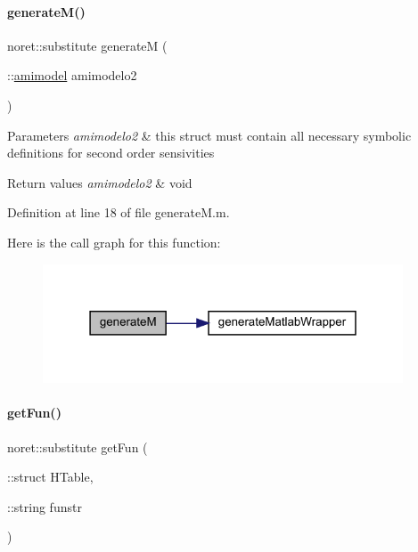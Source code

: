 \paragraph{\texorpdfstring{generateM()}{generateM()}}
{\footnotesize\ttfamily noret\+::substitute generateM (\begin{DoxyParamCaption}\item[{\+::\mbox{\hyperlink{classamimodel}{amimodel}}}]{amimodelo2 }\end{DoxyParamCaption})}


\begin{DoxyParams}{Parameters}
{\em amimodelo2} & this struct must contain all necessary symbolic definitions for second order sensivities\\
\hline
\end{DoxyParams}

\begin{DoxyRetVals}{Return values}
{\em amimodelo2} & void \\
\hline
\end{DoxyRetVals}


Definition at line 18 of file generate\+M.\+m.

Here is the call graph for this function\+:
\nopagebreak
\begin{figure}[H]
\begin{center}
\leavevmode
\includegraphics[width=303pt]{classamimodel_a6e93ea24824d9d90c322960e6d78fed0_cgraph}
\end{center}
\end{figure}
\mbox{\label{classamimodel_a08d58ae650e5ff9310760f6d3f08015c}} 
\paragraph{\texorpdfstring{getFun()}{getFun()}}
{\footnotesize\ttfamily noret\+::substitute get\+Fun (\begin{DoxyParamCaption}\item[{\+::struct}]{H\+Table,  }\item[{\+::string}]{funstr }\end{DoxyParamCaption})}


